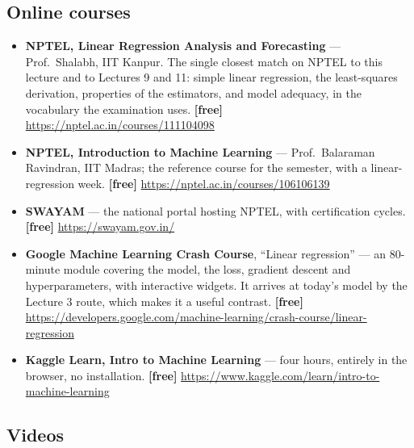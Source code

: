 \documentclass[11pt]{article}
\begin{document}
\subsection*{Online courses}

\begin{sloppypar}
\begin{itemize}[leftmargin=*]
  \item \textbf{NPTEL, Linear Regression Analysis and Forecasting} ---
    Prof.\ Shalabh, IIT Kanpur. The single closest match on NPTEL to this
    lecture and to Lectures 9 and 11: simple linear regression, the
    least-squares derivation, properties of the estimators, and model
    adequacy, in the vocabulary the examination uses. \textbf{[free]}
    \url{https://nptel.ac.in/courses/111104098}
  \item \textbf{NPTEL, Introduction to Machine Learning} --- Prof.\ Balaraman
    Ravindran, IIT Madras; the reference course for the semester, with a
    linear-regression week. \textbf{[free]}
    \url{https://nptel.ac.in/courses/106106139}
  \item \textbf{SWAYAM} --- the national portal hosting NPTEL, with
    certification cycles. \textbf{[free]} \url{https://swayam.gov.in/}
  \item \textbf{Google Machine Learning Crash Course}, ``Linear regression''
    --- an 80-minute module covering the model, the loss, gradient descent and
    hyperparameters, with interactive widgets. It arrives at today's model by
    the Lecture 3 route, which makes it a useful contrast.
    \textbf{[free]}
    \url{https://developers.google.com/machine-learning/crash-course/linear-regression}
  \item \textbf{Kaggle Learn, Intro to Machine Learning} --- four hours,
    entirely in the browser, no installation. \textbf{[free]}
    \url{https://www.kaggle.com/learn/intro-to-machine-learning}
\end{itemize}
\end{sloppypar}

\subsection*{Videos}
\end{document}

